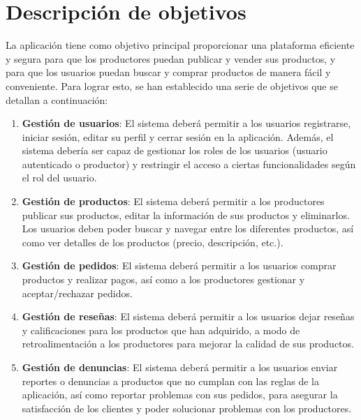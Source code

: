 
\section{Descripción de objetivos}\label{sec:descripcion-objetivos}

La aplicación tiene como objetivo principal proporcionar una plataforma eficiente y segura para que los productores puedan publicar y vender sus productos, y para que los usuarios puedan buscar y comprar productos de manera fácil y conveniente. Para lograr esto, se han establecido una serie de objetivos que se detallan a continuación:

\begin{enumerate}[label=OBJ-\protect\twodigits{\arabic*}:, align=left, leftmargin=*]
 
\item \textbf{Gestión de usuarios}: El sistema deberá permitir a los usuarios registrarse, iniciar sesión, editar su perfil y cerrar sesión en la aplicación. Además, el sistema debería ser capaz de gestionar los roles de los usuarios (usuario autenticado o productor) y restringir el acceso a ciertas funcionalidades según el rol del usuario.

\item \textbf{Gestión de productos}: El sistema deberá permitir a los productores publicar sus productos, editar la información de sus productos y eliminarlos. Los usuarios deben poder buscar y navegar entre los diferentes productos, así como ver detalles de los productos (precio, descripción, etc.).

\item \textbf{Gestión de pedidos}: El sistema deberá permitir a los usuarios comprar productos y realizar pagos, así como a los productores gestionar y aceptar/rechazar pedidos.

\item \textbf{Gestión de reseñas}: El sistema deberá permitir a los usuarios dejar reseñas y calificaciones para los productos que han adquirido, a modo de retroalimentación a los productores para mejorar la calidad de sus productos.

\item \textbf{Gestión de denuncias}: El sistema deberá permitir a los usuarios enviar reportes o denuncias a productos que no cumplan con las reglas de la aplicación, así como reportar problemas con sus pedidos, para asegurar la satisfacción de los clientes y poder solucionar problemas con los productores.


\end{enumerate}
